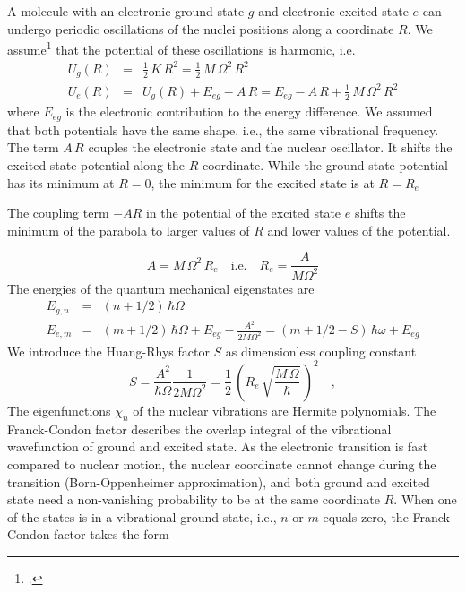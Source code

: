 A molecule with an electronic ground state $g$ and electronic excited state $e$ can undergo periodic oscillations of the nuclei positions along a coordinate $R$. We assume\footcite{Kuzmany} that the potential of these oscillations is harmonic, i.e.
\begin{eqnarray}
 U_g(R) &=& \frac{1}{2} \,  K \, R^2 = \frac{1}{2} \, M \, \Omega^2 \, R^2 \\
  U_e(R) &=&  U_g(R) + E_{eg} - A \, R = E_{eg}  - A \, R + \frac{1}{2} \, M \, \Omega^2 \, R^2 
 \end{eqnarray}
where $E_{eg}$ is the electronic contribution to the energy difference. We assumed that both potentials have the same shape, i.e., the same vibrational frequency. The term $A \, R$ couples the electronic state and the nuclear oscillator. It shifts the excited state potential along the $R$ coordinate. While the ground state potential has its minimum at $R=0$, the minimum for the excited state is at $R = R_e$
%
%
\begin{marginfigure}

\caption{The coupling term $-A R$ in the potential of the excited state $e$ shifts the minimum of the parabola to larger values of $R$ and lower values of the potential. }
\end{marginfigure}
%
%
\begin{equation}
 A = M \, \Omega^2 \, R_e	 \quad \text{i.e.} \quad R_e = \frac{A}{M \Omega^2}
\end{equation}
The energies of the quantum mechanical eigenstates are 
\begin{eqnarray}
  E_{g, n} &=&  (n + 1/2) \, \hbar \Omega  \\
  E_{e, m} &=&  (m + 1/2) \, \hbar \Omega  +  E_{eg} - \frac{A^2}{2 M \Omega^2} =
   (m + 1/2 - S) \, \hbar \omega  +  E_{eg}  \nonumber
\end{eqnarray}
We introduce the Huang-Rhys factor $S$ as dimensionless coupling constant
\begin{equation}
 S = \frac{A^2}{\hbar \Omega} \frac{1}{2 M \Omega^2}
 = \frac{1}{2} \, \left( R_e \, \sqrt{\frac{M \, \Omega}{\hbar}}\, \right)^2 \quad ,
\end{equation}
The eigenfunctions $\chi_n$ of the nuclear vibrations are Hermite polynomials. The Franck-Condon factor describes the overlap integral of the vibrational wavefunction of ground and excited state. As the electronic transition is fast compared to nuclear motion, the nuclear coordinate cannot change during the transition (Born-Oppenheimer approximation), and both ground and excited state need a non-vanishing probability to be at the same coordinate $R$. When one of the states is in a vibrational ground state, i.e., $n$ or $m$ equals zero, the Franck-Condon factor takes the form
